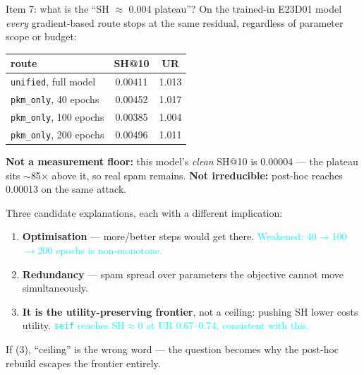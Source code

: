 \documentclass{beamer}
\newcommand{\pierre}[1]{\textcolor{cyan}{#1}}
\begin{document}
\begin{frame}{Item 7: what is the ``SH $\approx$ 0.004 plateau''?}
On the trained-in E23D01 model \emph{every} gradient-based route stops at the
same residual, regardless of parameter scope or budget:
\begin{center}
\begin{tabular}{|l|c|c|}
\hline
route & SH@10 & UR \\
\hline
\texttt{unified}, full model   & 0.00411 & 1.013 \\
\texttt{pkm\_only}, 40 epochs  & 0.00452 & 1.017 \\
\texttt{pkm\_only}, 100 epochs & 0.00385 & 1.004 \\
\texttt{pkm\_only}, 200 epochs & 0.00496 & 1.011 \\
\hline
\end{tabular}
\end{center}

\textbf{Not a measurement floor:} this model's \emph{clean} SH@10 is 0.00004 ---
the plateau sits $\sim$85$\times$ above it, so real spam remains.
\textbf{Not irreducible:} post-hoc reaches 0.00013 on the same attack.

\medskip
Three candidate explanations, each with a different implication:
\begin{enumerate}
  \item \textbf{Optimisation} --- more/better steps would get there.
        \pierre{Weakened: 40$\to$100$\to$200 epochs is non-monotone.}
  \item \textbf{Redundancy} --- spam spread over parameters the objective cannot
        move simultaneously.
  \item \textbf{It is the utility-preserving frontier}, not a ceiling: pushing SH
        lower costs utility. \pierre{\texttt{seif} reaches SH$\approx$0 at
        UR 0.67--0.74, consistent with this.}
\end{enumerate}

\medskip
\alert{If (3), ``ceiling'' is the wrong word} --- the question becomes why the
post-hoc rebuild escapes the frontier entirely.
\end{frame}
\end{document}
